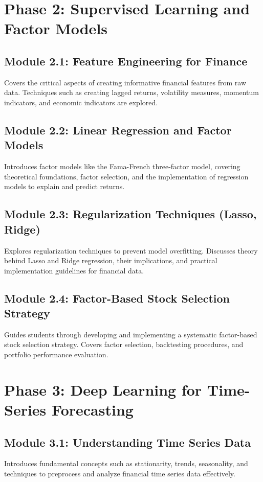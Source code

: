\documentclass{article}
\begin{document}
\section{Phase 2: Supervised Learning and Factor Models}

\subsection{Module 2.1: Feature Engineering for Finance}
Covers the critical aspects of creating informative financial features from raw data. Techniques such as creating lagged returns, volatility measures, momentum indicators, and economic indicators are explored.

\subsection{Module 2.2: Linear Regression and Factor Models}
Introduces factor models like the Fama-French three-factor model, covering theoretical foundations, factor selection, and the implementation of regression models to explain and predict returns.

\subsection{Module 2.3: Regularization Techniques (Lasso, Ridge)}
Explores regularization techniques to prevent model overfitting. Discusses theory behind Lasso and Ridge regression, their implications, and practical implementation guidelines for financial data.

\subsection{Module 2.4: Factor-Based Stock Selection Strategy}
Guides students through developing and implementing a systematic factor-based stock selection strategy. Covers factor selection, backtesting procedures, and portfolio performance evaluation.

\section{Phase 3: Deep Learning for Time-Series Forecasting}

\subsection{Module 3.1: Understanding Time Series Data}
Introduces fundamental concepts such as stationarity, trends, seasonality, and techniques to preprocess and analyze financial time series data effectively.
\end{document}
